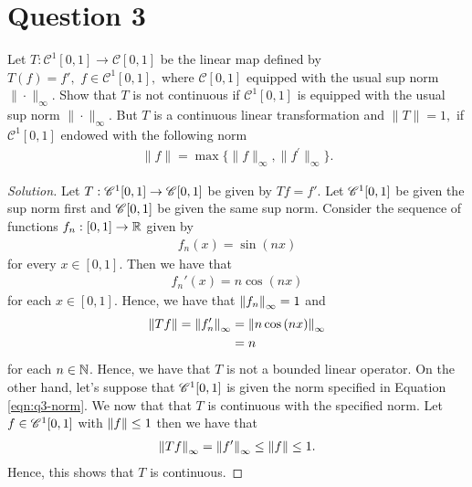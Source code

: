\section{Question 3}
\horz
Let $T: \mathscr C^1[0, 1] \rightarrow \mathscr C[0, 1]$ be the linear map defined by $T(f) = f',\,\,f\in  \mathscr C^1[0, 1],$ where $\mathscr C[0,1]$ equipped with  the usual sup norm $\|\cdot\|_{\infty}.$ Show that $T$ is not continuous if $\mathscr C^1[0,1]$ is equipped with  the usual sup norm $\|\cdot\|_{\infty}.$ But $T$ is a continuous linear transformation and $\|T\|=1,$ if   $\mathscr C^1[0, 1]$ endowed with the following norm 
\begin{align}
    \|f\| = \max \{\|f\|_{\infty},\|f^{\prime}\|_{\infty}\}.
    \label{eqn:q3-norm}
\end{align}
\horz

\begin{proof}[Solution]
    Let $T: {\mathscr C} ^{1} [0,1] \to {\mathscr C} [0,1]$ be given by $Tf=f'$. Let ${\mathscr C}^{1} [0,1]$ be given the sup norm first and ${\mathscr C}[0,1]$ be given the same sup norm. Consider the sequence of functions $f_{n} : [0,1] \to \mathbb R$ given by 
    \begin{align*}
	f_{n} \left( x \right) = \sin \left( nx \right)
    \end{align*}
    for every $x\in [0,1]$. Then we have that
    \begin{align*}
	f_{n}' \left( x \right) = n \cos \left( nx \right)
    \end{align*}
    for each $x \in [0,1]$.
    Hence, we have that $\left\lVert f_{n} \right\rVert_{\infty} = 1$ and
    \begin{align*}
	\left\lVert Tf \right\rVert=\left\lVert f_{n}' \right\rVert_{\infty} &= \left\lVert n \cos \left( nx \right) \right\rVert_{\infty} \\
	&= n
    \end{align*}
    for each $n\in \mathbb N$.
    Hence, we have that $T$ is not a bounded linear operator. On the other hand, let's suppose that ${\mathscr C} ^{1} [0,1]$ is given the norm specified in Equation \ref{eqn:q3-norm}. We now that that $T$ is continuous with the specified norm. Let $f\in {\mathscr C}^{1}[0,1]$ with $\left\lVert f \right\rVert \le 1$ then we have that
    \begin{align*}
	\left\lVert Tf \right\rVert_{\infty}=\left\lVert f' \right\rVert_{\infty} \le \left\lVert f \right\rVert \le 1\text{.}
    \end{align*}
    Hence, this shows that $T$ is continuous.
\end{proof}
